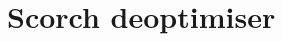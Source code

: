 \documentclass[a4paper,12pt,twoside]{../includes/ThesisStyle}
\begin{document}








\section{Scorch deoptimiser}
\label{sec:deoptRec}
\end{document}
